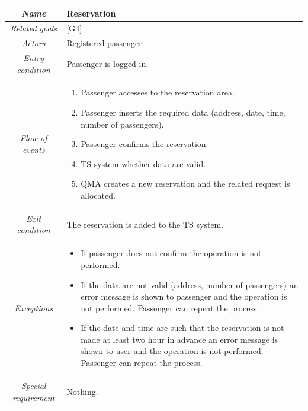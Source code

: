 \begin{flushleft}
\begin{tabular}{c|>{\centering}p{10cm}}
\hline 
\emph{Name} & \raggedright{}Reservation\tabularnewline
\hline 
\emph{Related goals} & \raggedright{}{[}G4{]}\tabularnewline
\hline 
\emph{Actors} & \raggedright{}Registered passenger\tabularnewline
\hline 
\emph{Entry condition} & \raggedright{}Passenger is logged in.\tabularnewline
\hline 
\emph{Flow of events} & \begin{enumerate}
\item \begin{raggedright}
Passenger accesses to the reservation area.
\par\end{raggedright}
\item \begin{raggedright}
Passenger inserts the required data (address, date, time, number of
passengers).
\par\end{raggedright}
\item \begin{raggedright}
Passenger confirms the reservation.
\par\end{raggedright}
\item \begin{raggedright}
TS system whether data are valid. 
\par\end{raggedright}
\item \raggedright{}QMA creates a new reservation and the related request
is allocated.\end{enumerate}
\tabularnewline
\hline 
\emph{Exit condition} & \raggedright{}The reservation is added to the TS system.\tabularnewline
\hline 
\emph{Exceptions} & \begin{itemize}
\item \begin{raggedright}
If passenger does not confirm the operation is not performed.
\par\end{raggedright}
\item \begin{raggedright}
If the data are not valid (address, number of passengers) an error
message is shown to passenger and the operation is not performed.
Passenger can repeat the process.
\par\end{raggedright}
\item \raggedright{}If the date and time are such that the reservation is
not made at least two hour in advance an error message is shown to
user and the operation is not performed. Passenger can repeat the
process.\end{itemize}
\tabularnewline
\hline 
\emph{Special requirement} & \raggedright{}Nothing.\tabularnewline
\hline 
\end{tabular}
\par\end{flushleft}

